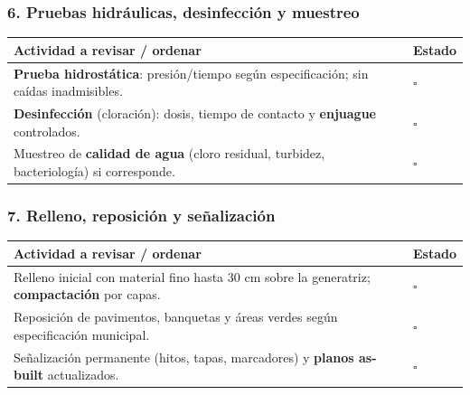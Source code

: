 \documentclass[12pt]{article}
\newcommand{\cbox}{\(\square\)}
\renewcommand{\cbox}{\(\square\)} %
\begin{document}
	\subsubsection*{6. Pruebas hidráulicas, desinfección y muestreo}
	\begin{tabularx}{\linewidth}{>{\raggedright\arraybackslash}p{0.93\linewidth} >{\centering\arraybackslash}m{0.07\linewidth}}
		\toprule
		\textbf{Actividad a revisar / ordenar} & \textbf{Estado}\\
		\midrule
		\textbf{Prueba hidrostática}: presión/tiempo según especificación; sin caídas inadmisibles. & \cbox \\
		\textbf{Desinfección} (cloración): dosis, tiempo de contacto y \textbf{enjuague} controlados. & \cbox \\
		Muestreo de \textbf{calidad de agua} (cloro residual, turbidez, bacteriología) si corresponde. & \cbox \\
		\bottomrule
	\end{tabularx}
	
	\subsubsection*{7. Relleno, reposición y señalización}
	\begin{tabularx}{\linewidth}{>{\raggedright\arraybackslash}p{0.93\linewidth} >{\centering\arraybackslash}m{0.07\linewidth}}
		\toprule
		\textbf{Actividad a revisar / ordenar} & \textbf{Estado}\\
		\midrule
		Relleno inicial con material fino hasta 30 cm sobre la generatriz; \textbf{compactación} por capas. & \cbox \\
		Reposición de pavimentos, banquetas y áreas verdes según especificación municipal. & \cbox \\
		Señalización permanente (hitos, tapas, marcadores) y \textbf{planos as-built} actualizados. & \cbox \\
		\bottomrule
	\end{tabularx}
	

	
	
	
	
	
	
	
	
	



\end{document}

